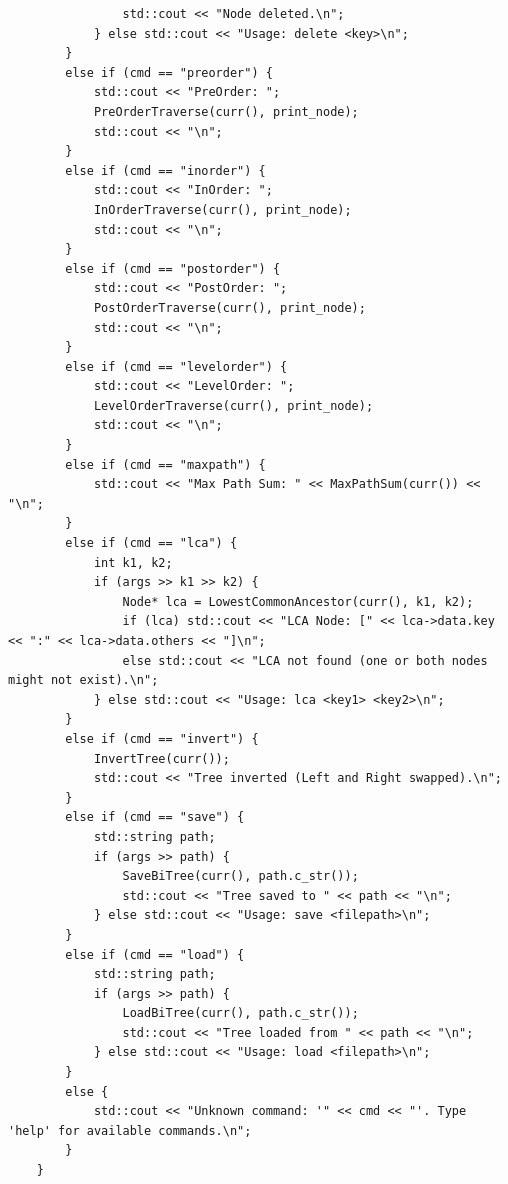 \documentclass[supercite]{Experimental_Report}
\theoremstyle{definition}
\begin{document}
\begin{lstlisting}
				std::cout << "Node deleted.\n";
			} else std::cout << "Usage: delete <key>\n";
		}
		else if (cmd == "preorder") {
			std::cout << "PreOrder: ";
			PreOrderTraverse(curr(), print_node);
			std::cout << "\n";
		}
		else if (cmd == "inorder") {
			std::cout << "InOrder: ";
			InOrderTraverse(curr(), print_node);
			std::cout << "\n";
		}
		else if (cmd == "postorder") {
			std::cout << "PostOrder: ";
			PostOrderTraverse(curr(), print_node);
			std::cout << "\n";
		}
		else if (cmd == "levelorder") {
			std::cout << "LevelOrder: ";
			LevelOrderTraverse(curr(), print_node);
			std::cout << "\n";
		}
		else if (cmd == "maxpath") {
			std::cout << "Max Path Sum: " << MaxPathSum(curr()) << "\n";
		}
		else if (cmd == "lca") {
			int k1, k2;
			if (args >> k1 >> k2) {
				Node* lca = LowestCommonAncestor(curr(), k1, k2);
				if (lca) std::cout << "LCA Node: [" << lca->data.key << ":" << lca->data.others << "]\n";
				else std::cout << "LCA not found (one or both nodes might not exist).\n";
			} else std::cout << "Usage: lca <key1> <key2>\n";
		}
		else if (cmd == "invert") {
			InvertTree(curr());
			std::cout << "Tree inverted (Left and Right swapped).\n";
		}
		else if (cmd == "save") {
			std::string path;
			if (args >> path) {
				SaveBiTree(curr(), path.c_str());
				std::cout << "Tree saved to " << path << "\n";
			} else std::cout << "Usage: save <filepath>\n";
		}
		else if (cmd == "load") {
			std::string path;
			if (args >> path) {
				LoadBiTree(curr(), path.c_str());
				std::cout << "Tree loaded from " << path << "\n";
			} else std::cout << "Usage: load <filepath>\n";
		}
		else {
			std::cout << "Unknown command: '" << cmd << "'. Type 'help' for available commands.\n";
		}
	}
	

\end{lstlisting}
\end{document}
